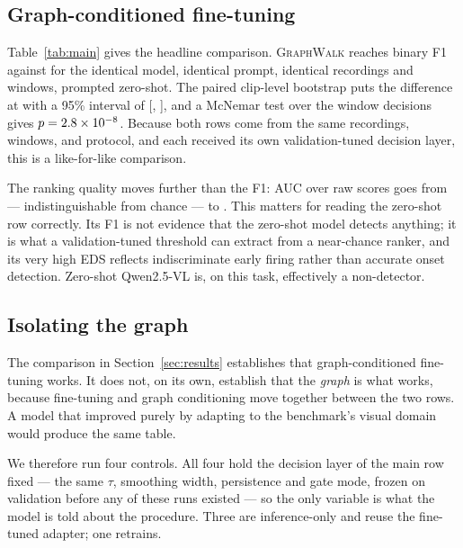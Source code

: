 \documentclass[10pt,twocolumn]{article}
\newcommand{\ourmodel}{\textsc{GraphWalk}}
\begin{document}
\subsection{Graph-conditioned fine-tuning}

Table~\ref{tab:main} gives the headline comparison. \ourmodel{} reaches \resF{}
binary F1 against \resZS{} for the identical model, identical prompt, identical
recordings and windows, prompted zero-shot. The paired clip-level bootstrap puts
the difference at \resDelta{} with a 95\% interval of [\resDeltaLo{},
\resDeltaHi{}], and a McNemar test over the \resWindows{} window decisions gives
$p = 2.8\times 10^{-8}$. Because both rows come from the same recordings, windows, and
protocol, and each received its own validation-tuned decision layer, this is a
like-for-like comparison.

The ranking quality moves further than the F1: AUC over raw scores goes from
\resAUCzs{} --- indistinguishable from chance --- to \resAUC{}. This matters for
reading the zero-shot row correctly. Its \resZS{} F1 is not evidence that the
zero-shot model detects anything; it is what a validation-tuned threshold can
extract from a near-chance ranker, and its very high EDS reflects indiscriminate
early firing rather than accurate onset detection. Zero-shot Qwen2.5-VL is, on
this task, effectively a non-detector.

\subsection{Isolating the graph}
\label{sec:graphablation}

The comparison in Section~\ref{sec:results} establishes that graph-conditioned
fine-tuning works. It does not, on its own, establish that the \emph{graph} is
what works, because fine-tuning and graph conditioning move together between the
two rows. A model that improved purely by adapting to the benchmark's visual
domain would produce the same table.

We therefore run four controls. All four hold the decision layer of the main row
fixed --- the same $\tau$, smoothing width, persistence and gate mode, frozen on
validation before any of these runs existed --- so the only variable is what the
model is told about the procedure. Three are inference-only and reuse the
fine-tuned adapter; one retrains.
\end{document}
